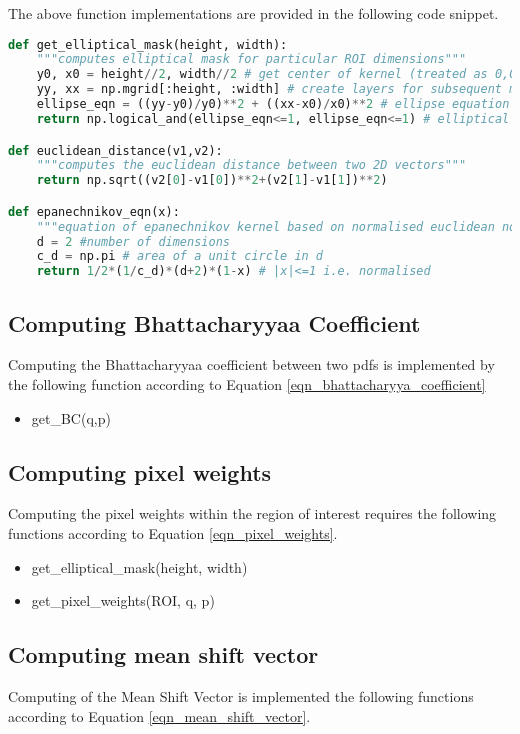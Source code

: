 The above function implementations are provided in the following code snippet.

\begin{lstlisting}[language=Python]
def get_elliptical_mask(height, width):
    """computes elliptical mask for particular ROI dimensions"""
    y0, x0 = height//2, width//2 # get center of kernel (treated as 0,0) - note these are also hy and hx 
    yy, xx = np.mgrid[:height, :width] # create layers for subsequent mask
    ellipse_eqn = ((yy-y0)/y0)**2 + ((xx-x0)/x0)**2 # ellipse equation
    return np.logical_and(ellipse_eqn<=1, ellipse_eqn<=1) # elliptical mask for kernel

def euclidean_distance(v1,v2):
    """computes the euclidean distance between two 2D vectors"""
    return np.sqrt((v2[0]-v1[0])**2+(v2[1]-v1[1])**2)

def epanechnikov_eqn(x):
    """equation of epanechnikov kernel based on normalised euclidean norm squared"""
    d = 2 #number of dimensions
    c_d = np.pi # area of a unit circle in d  
    return 1/2*(1/c_d)*(d+2)*(1-x) # |x|<=1 i.e. normalised


\end{lstlisting}

\subsection{Computing Bhattacharyyaa Coefficient}
Computing the Bhattacharyyaa coefficient between two pdfs is implemented by the
following function according to Equation \ref{eqn_bhattacharyya_coefficient}
\begin{itemize}
    \item get\_BC(q,p)
\end{itemize}

\subsection{Computing pixel weights}
Computing the pixel weights within the region of interest requires the following
functions according to Equation \ref{eqn_pixel_weights}.

\begin{itemize}
    \item get\_elliptical\_mask(height, width)
    \item get\_pixel\_weights(ROI, q, p)
\end{itemize}

\subsection{Computing mean shift vector}
Computing of the Mean Shift Vector is implemented the following functions
according to Equation \ref{eqn_mean_shift_vector}.

